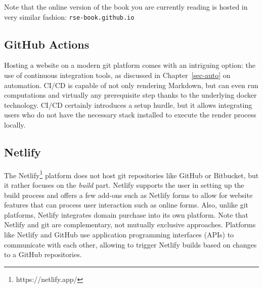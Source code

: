 \documentclass[
  12pt,
  letterpaper,
]{krantz}
\begin{document}
\begin{tcolorbox}[enhanced jigsaw, left=2mm, arc=.35mm, colbacktitle=quarto-callout-note-color!10!white, breakable, colframe=quarto-callout-note-color-frame, bottomrule=.15mm, bottomtitle=1mm, colback=white, leftrule=.75mm, coltitle=black, toptitle=1mm, titlerule=0mm, title=\textcolor{quarto-callout-note-color}{\faInfo}\hspace{0.5em}{Note}, opacityback=0, rightrule=.15mm, toprule=.15mm, opacitybacktitle=0.6]

Note that the online version of the book you are currently reading is
hosted in very similar fashion: \texttt{rse-book.github.io}

\end{tcolorbox}

\hypertarget{github-actions}{%
\subsection{\texorpdfstring{GitHub
Actions}{GitHub Actions}}\label{github-actions}}

Hosting a website on a modern git platform comes with an intriguing
option: the use of continuous integration tools, as discussed in
Chapter~\ref{sec-auto} on automation.
CI/CD is capable of not only rendering Markdown, but can
even run computations and virtually any prerequisite step thanks to the
underlying docker technology. CI/CD certainly
introduces a setup hurdle, but it allows integrating users who do not
have the necessary stack installed to execute the render
process locally.

\hypertarget{netlify}{%
\subsection{Netlify}\label{netlify}}

The Netlify\footnote{https://netlify.app/} platform does not host git
repositories like GitHub or Bitbucket, but it rather
focuses on the \emph{build} part. Netlify supports the user in setting
up the build process and offers a few add-ons such as Netlify forms to
allow for website features that can process user interaction such as
online forms. Also, unlike git platforms, Netlify integrates domain
purchase into its own platform. Note that Netlify and git are
complementary, not mutually exclusive approaches. Platforms like Netlify
and GitHub use application programming interfaces (APIs)
to communicate with each other, allowing to trigger Netlify builds based
on changes to a GitHub repositories.
\end{document}
